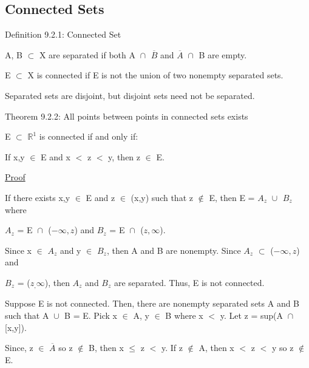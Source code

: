 \subsection{ Connected Sets }

{ \color{blue} Definition 9.2.1: Connected Set } 

	\begin{adjustbox}{minipage=14cm, right, vspace=0.1cm 0cm}
		A, B $\subset$ X are separated if both
		A $\cap_{}^{}$ $\overline{B}$ and
		$\overline{A}$ $\cap_{}^{}$ B are empty.

		E $\subset$ X is connected if E is not the union of two nonempty
		separated sets.

		Separated sets are disjoint, but disjoint sets need not be separated. \\
	\end{adjustbox}

\newpage

{ \color{red} Theorem 9.2.2: All points between points in connected sets exists } 

	\begin{adjustbox}{minipage=14cm, right, vspace=0.1cm 0cm}
		E $\subset$ $\mathbb{R}^1$ is connected if and only if:

		\hspace{1cm} If x,y $\in$ E and x $<$ z $<$ y, then z $\in$ E.
	\end{adjustbox}

{ \color{magenta} \underline{Proof} } 

	If there exists x,y $\in$ E and z $\in$ (x,y) such that z $\not \in$ E,
	then E = $A_z$ $\cup_{}^{}$ $B_z$ where
	
	$A_z$ = E $\cap_{}^{}$ ($-\infty,z$)
	and $B_z$ = E $\cap_{}^{}$ ($z,\infty$).

	Since x $\in$ $A_z$ and y $\in$ $B_z$, then A and B are nonempty.
	Since $A_z$ $\subset$ ($-\infty,z$) and
	
	$B_z$ = ($z_,\infty$),
	then $A_z$ and $B_z$ are separated. Thus, E is not connected.

	\vspace{0.2cm}

	Suppose E is not connected. Then, there are nonempty separated sets
	A and B such that A $\cup_{}^{}$ B = E. Pick x $\in$ A, y $\in$ B
	where x $<$ y. Let z = sup(A $\cap_{}^{}$ [x,y]).

	Since, z $\in$ $\overline{A}$ so z $\not \in$ B, then x $\leq$ z $<$ y.
	If z $\not \in$ A, then x $<$ z $<$ y so z $\not \in$ E.

